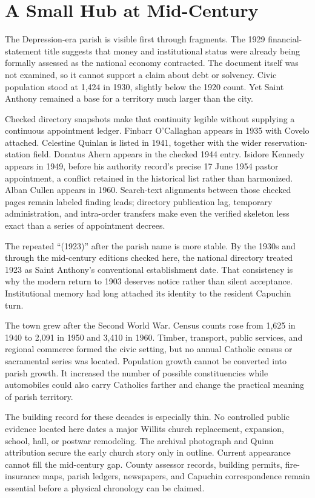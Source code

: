 \section{A Small Hub at Mid-Century}

The Depression-era parish is visible first through fragments. The 1929 financial-statement title suggests that money and institutional status were already being formally assessed as the national economy contracted. The document itself was not examined, so it cannot support a claim about debt or solvency. Civic population stood at 1,424 in 1930, slightly below the 1920 count. Yet Saint Anthony remained a base for a territory much larger than the city.

Checked directory snapshots make that continuity legible without supplying a continuous appointment ledger. Finbarr O'Callaghan appears in 1935 with Covelo attached. Celestine Quinlan is listed in 1941, together with the wider reservation-station field. Donatus Ahern appears in the checked 1944 entry. Isidore Kennedy appears in 1949, before his authority record's precise 17 June 1954 pastor appointment, a conflict retained in the historical list rather than harmonized. Alban Cullen appears in 1960. Search-text alignments between those checked pages remain labeled finding leads; directory publication lag, temporary administration, and intra-order transfers make even the verified skeleton less exact than a series of appointment decrees.

The repeated ``(1923)'' after the parish name is more stable. By the 1930s and through the mid-century editions checked here, the national directory treated 1923 as Saint Anthony's conventional establishment date. That consistency is why the modern return to 1903 deserves notice rather than silent acceptance. Institutional memory had long attached its identity to the resident Capuchin turn.

The town grew after the Second World War. Census counts rose from 1,625 in 1940 to 2,091 in 1950 and 3,410 in 1960. Timber, transport, public services, and regional commerce formed the civic setting, but no annual Catholic census or sacramental series was located. Population growth cannot be converted into parish growth. It increased the number of possible constituencies while automobiles could also carry Catholics farther and change the practical meaning of parish territory.

The building record for these decades is especially thin. No controlled public evidence located here dates a major Willits church replacement, expansion, school, hall, or postwar remodeling. The archival photograph and Quinn attribution secure the early church story only in outline. Current appearance cannot fill the mid-century gap. County assessor records, building permits, fire-insurance maps, parish ledgers, newspapers, and Capuchin correspondence remain essential before a physical chronology can be claimed.


